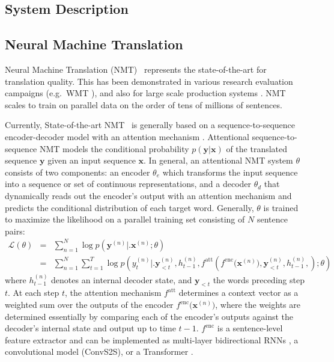\documentclass[a4paper]{article}
\begin{document}
\begin{CJK*}{UTF8}{gbsn}
\section{System Description}
\label{sec:sys-desc}
\subsection{Neural Machine Translation}
Neural Machine Translation (NMT)~\cite{bahdanau2014neural} represents the state-of-the-art for translation quality. This has been demonstrated in various research evaluation campaigns (e.g.~WMT \cite{bojar-EtAl:2017:WMT1}), and also for large scale production systems \cite{wu2016google,devlin:2017:EMNLP2017}. NMT scales to train on parallel data on the order of tens of millions of sentences.

Currently, State-of-the-art NMT~\cite{bahdanau2014neural,sutskever2014sequence} is generally based on a sequence-to-sequence encoder-decoder model  with an attention mechanism \cite{bahdanau2014neural}. Attentional sequence-to-sequence NMT models the conditional probability $p(\mathbf{y}|\mathbf{x})$ of the translated sequence $\mathbf{y}$ given an input sequence $\mathbf{x}$.  
In general, an attentional NMT system $\theta$ consists of two components: an encoder $\theta_e$ which transforms the input sequence into a sequence or set of continuous representations,
and a decoder $\theta_d$ that dynamically reads out the encoder's output with an attention mechanism and predicts the conditional distribution of each target word. 
Generally, $\theta$ is trained to maximize the likelihood on a parallel training set consisting of $N$ sentence pairs: 
\begin{eqnarray}
	\mathcal{L}(\theta) & = &
    	\sum_{n=1}^N\log p\left(\mathbf{y}^{(n)}\bigl|\bigr.
        					\mathbf{x}^{(n)}; \theta\right) \nonumber\\
    & = &
    	\sum_{n=1}^N\sum_{t=1}^T\log p\left(y_t^{(n)}\bigl|\bigr.
        	\mathbf{y}_{<t}^{(n)}, h_{t-1}^{(n)},
        	f^{\mathrm{att}}\left(
            	f^{\mathrm{enc}}\bigl(\mathbf{x}^{(n)}\bigr),
                	\mathbf{y}_{<t}^{(n)}, h_{t-1}^{(n)},
            \right);
            \theta\right)
	 \label{eq.loss} 
\end{eqnarray}
where $h_{t-1}^{(n)}$ denotes an internal decoder state, and $\mathbf{y}_{<t}$ the words preceding step $t$. At each step $t$, the attention mechanism $f^{\mathrm{att}}$ determines a context vector as a weighted sum over the outputs of the encoder $f^{\mathrm{enc}}\bigl(\mathbf{x}^{(n)}\bigr)$, where the weights
are determined essentially by comparing each of the encoder's outputs
against the decoder's internal state and output up to time $t-1$.
$f^{\mathrm{enc}}$ is a sentence-level feature extractor and can be implemented as multi-layer bidirectional RNNs \cite{bahdanau2014neural,wu2016google}, a convolutional model (ConvS2S), \cite{gehring2017convolutional} or a Transformer \cite{vaswani2017attention}. 


\end{CJK*}
\end{document}

